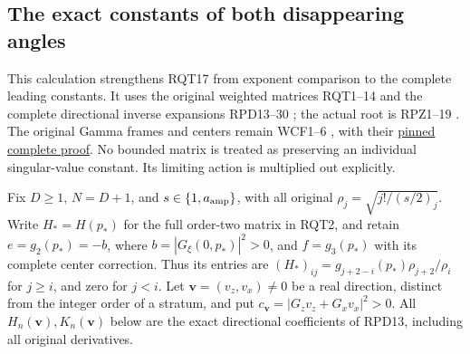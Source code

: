 \subsection{The exact constants of both disappearing angles}
This calculation strengthens RQT17 from exponent comparison to the
complete leading constants.  It uses the original weighted matrices
RQT1--14 and the complete directional inverse expansions
RPD13--30 \cite{RPD006}; the actual root is RPZ1--19 \cite{RPZ005}.
The original Gamma frames and centers remain WCF1--6 \cite{WCF},
with their
\href{https://github.com/KokunoYumeto/zeta-function-research-reader/blob/5992ad50c0f2a06921f1fcaded7b4e38097c0739/workbenches/splitzero-tandem/continuations/20260920-original-kernel-mixed-determinants/providers/WEIGHTED_CONDUCTOR_FORWARD.tex#L28}{pinned complete proof}.
No bounded matrix is treated as preserving an individual singular-value
constant.  Its limiting action is multiplied out explicitly.

Fix $D\ge1$, $N=D+1$, and $s\in\{1,a_{\rm amp}\}$, with all
original $\rho_j=\sqrt{j!/(s/2)_j}$.  Write $H_*=H(p_*)$ for the
full order-two matrix in RQT2, and retain $e=g_2(p_*)=-b$, where
$b=|G_\xi(0,p_*)|^2>0$, and $f=g_3(p_*)$ with its complete center
correction.  Thus its entries are
$(H_*)_{ij}=g_{j+2-i}(p_*)\rho_{j+2}/\rho_i$ for $j\ge i$,
and zero for $j<i$.  Let $\mathbf v=(v_z,v_x)\ne0$ be a real
direction, distinct from the integer order of a stratum, and put
$c_{\mathbf v}=|G_zv_z+G_xv_x|^2>0$.
All $H_n(\mathbf v),K_n(\mathbf v)$ below are the exact directional
coefficients of RPD13, including all original derivatives.


